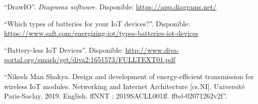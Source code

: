 \begin{references}
    “DrawIO”. \textit{Diagrama software}. Disponible: \url{https://app.diagrams.net/}

    “Which types of batteries for your IoT devices?”. Disponible: \url{https://www.saft.com/energizing-iot/types-batteries-iot-devices}

    “Battery-less IoT Devices”. Disponible: \url{http://www.diva-portal.org/smash/get/diva2:1651573/FULLTEXT01.pdf}

    “Nikesh Man Shakya. Design and development of energy-efficient transmission for wireless IoT modules. Networking and Internet Architecture [cs.NI]. Université Paris-Saclay, 2019. English. ffNNT :
    2019SACLL001ff. fftel-02071262v2f”.

\end{references}

